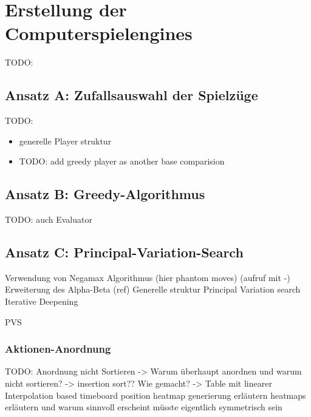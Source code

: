 \chapter{Erstellung der Computerspielengines}
\label{chapter:erstellung-der-computerspielengines}

TODO:

\section{Ansatz A: Zufallsauswahl der Spielzüge}
\label{section:erstellung-ansatz-a}

TODO:

\begin{itemize}
    \item generelle Player struktur
    \item TODO: add greedy player as another base comparision
\end{itemize}



\section{Ansatz B: Greedy-Algorithmus}

TODO: auch Evaluator

\section{Ansatz C: Principal-Variation-Search}
\label{section:erstellung-ansatz-b}

Verwendung von Negamax Algorithmus (hier phantom moves) (aufruf mit -)
Erweiterung des Alpha-Beta (ref) Generelle struktur Principal Variation search
Iterative Deepening

\ac{PVS}

\subsection{Aktionen-Anordnung}

TODO:
\cite{2022.MoveOrdering}
Anordnung nicht Sortieren -> Warum überhaupt anordnen und warum nicht sortieren?
-> insertion sort??
Wie gemacht? -> Table mit linearer Interpolation based timeboard position
heatmap generierung erläutern
heatmaps erläutern und warum sinnvoll erscheint
müsste eigentlich symmetrisch sein

